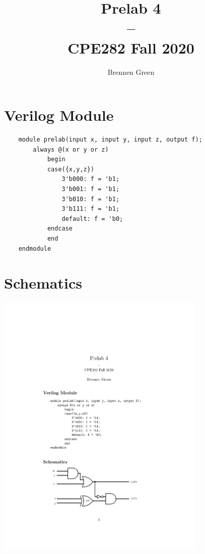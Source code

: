 \documentclass[11pt]{article}
\begin{document}
\date{} 
\title{Prelab 4\\--\\\large CPE282 Fall 2020}
\author{Brennen Green}
\maketitle

\section*{Verilog Module}
\begin{center}
    \begin{verbatim}
    module prelab(input x, input y, input z, output f);
        always @(x or y or z)
            begin
            case({x,y,z})
                3'b000: f = 'b1;
                3'b001: f = 'b1;
                3'b010: f = 'b1;
                3'b111: f = 'b1;
                default: f = 'b0;
            endcase
            end
    endmodule
    \end{verbatim}
\end{center}

\section*{Schematics}
\begin{center}
\includegraphics[width=10cm, keepaspectratio]{prelab}\newline
\end{center}
\end{document}
